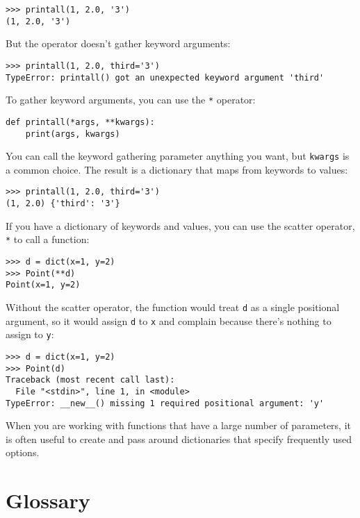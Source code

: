 \documentclass[10pt]{book}
\begin{document}
\begin{verbatim}
>>> printall(1, 2.0, '3')
(1, 2.0, '3')
\end{verbatim}
%
But the {\tt *} operator doesn't gather keyword arguments:

\begin{verbatim}
>>> printall(1, 2.0, third='3')
TypeError: printall() got an unexpected keyword argument 'third'
\end{verbatim}
%
To gather keyword arguments, you can use the {\tt **} operator:

\begin{verbatim}
def printall(*args, **kwargs):
    print(args, kwargs)
\end{verbatim}
%
You can call the keyword gathering parameter anything you want, but
{\tt kwargs} is a common choice.  The result is a dictionary that maps
from keywords to values:

\begin{verbatim}
>>> printall(1, 2.0, third='3')
(1, 2.0) {'third': '3'}
\end{verbatim}
%
If you have a dictionary of keywords and values, you can use the
scatter operator, {\tt **} to call a function:

\begin{verbatim}
>>> d = dict(x=1, y=2)
>>> Point(**d)
Point(x=1, y=2)
\end{verbatim}
%
Without the scatter operator, the function would treat {\tt d} as
a single positional argument, so it would assign {\tt d} to
{\tt x} and complain because there's nothing to assign to {\tt y}:

\begin{verbatim}
>>> d = dict(x=1, y=2)
>>> Point(d)
Traceback (most recent call last):
  File "<stdin>", line 1, in <module>
TypeError: __new__() missing 1 required positional argument: 'y'
\end{verbatim}
%
When you are working with functions that have a large number of
parameters, it is often useful to create and pass around dictionaries
that specify frequently used options.


\section{Glossary}
\end{document}
